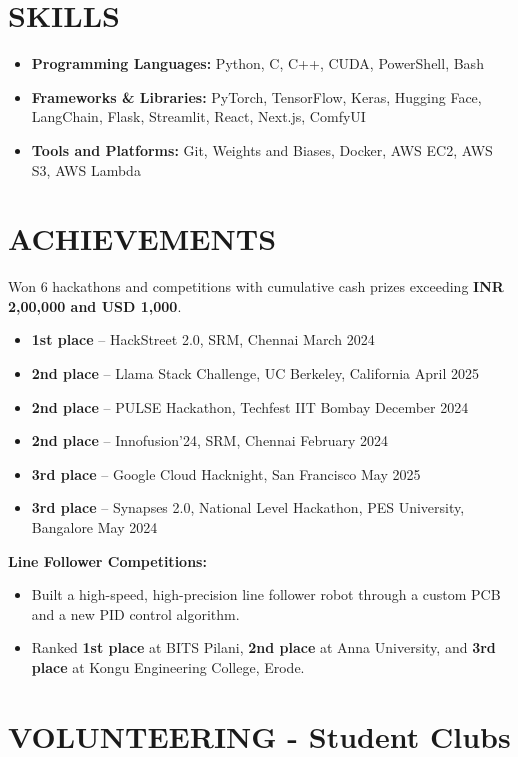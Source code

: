 \documentclass[a4paper,9pt]{extarticle}
\begin{document}
\section*{SKILLS}
\begin{itemize}
    \item \textbf{Programming Languages:} Python, C, C++, CUDA, PowerShell, Bash
    \item \textbf{Frameworks \& Libraries:} PyTorch, TensorFlow, Keras, Hugging Face, LangChain, Flask, Streamlit, React, Next.js, ComfyUI
    \item \textbf{Tools and Platforms:} Git, Weights and Biases, Docker, AWS EC2, AWS S3, AWS Lambda
\end{itemize}

\section*{ACHIEVEMENTS}
Won 6 hackathons and competitions with cumulative cash prizes exceeding \textbf{INR 2,00,000 and USD 1,000}.
\begin{itemize}
    \item \textbf{1st place} – HackStreet 2.0, SRM, Chennai \hfill March 2024
    \item \textbf{2nd place} – Llama Stack Challenge, UC Berkeley, California \hfill April 2025
    \item \textbf{2nd place} – PULSE Hackathon, Techfest IIT Bombay \hfill December 2024    
    \item \textbf{2nd place} – Innofusion'24, SRM, Chennai \hfill February 2024
    \item \textbf{3rd place} – Google Cloud Hacknight, San Francisco \hfill May 2025
    \item \textbf{3rd place} – Synapses 2.0, National Level Hackathon, PES University, Bangalore \hfill May 2024
\end{itemize}
\textbf{Line Follower Competitions:}
    \begin{itemize}
        \item Built a high-speed, high-precision line follower robot through a custom PCB and a new PID control algorithm.
        \item Ranked \textbf{1st place} at BITS Pilani, \textbf{2nd place} at Anna University, and \textbf{3rd place} at Kongu Engineering College, Erode.
    \end{itemize}
    
\section*{VOLUNTEERING - Student Clubs}
\end{document}
